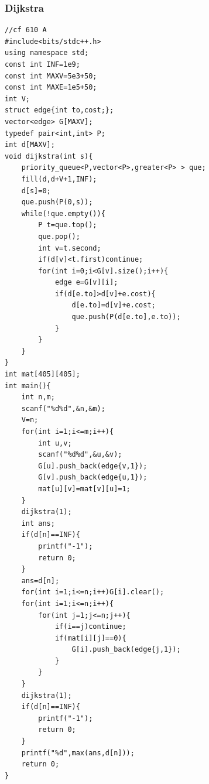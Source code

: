 \documentclass[twoside]{article}
\begin{document}
\subsubsection{Dijkstra}
\begin{lstlisting}
//cf 610 A
#include<bits/stdc++.h>
using namespace std;
const int INF=1e9;
const int MAXV=5e3+50;
const int MAXE=1e5+50;
int V;
struct edge{int to,cost;};
vector<edge> G[MAXV];
typedef pair<int,int> P;
int d[MAXV];
void dijkstra(int s){
    priority_queue<P,vector<P>,greater<P> > que;
    fill(d,d+V+1,INF);
    d[s]=0;
    que.push(P(0,s));
    while(!que.empty()){
        P t=que.top();
        que.pop();
        int v=t.second;
        if(d[v]<t.first)continue;
        for(int i=0;i<G[v].size();i++){
            edge e=G[v][i];
            if(d[e.to]>d[v]+e.cost){
                d[e.to]=d[v]+e.cost;
                que.push(P(d[e.to],e.to));
            }
        }
    }
}
int mat[405][405];
int main(){
    int n,m;
    scanf("%d%d",&n,&m);
    V=n;
    for(int i=1;i<=m;i++){
        int u,v;
        scanf("%d%d",&u,&v);
        G[u].push_back(edge{v,1});
        G[v].push_back(edge{u,1});
        mat[u][v]=mat[v][u]=1;
    }
    dijkstra(1);
    int ans;
    if(d[n]==INF){
        printf("-1");
        return 0;
    }
    ans=d[n];
    for(int i=1;i<=n;i++)G[i].clear();
    for(int i=1;i<=n;i++){
        for(int j=1;j<=n;j++){
            if(i==j)continue;
            if(mat[i][j]==0){
                G[i].push_back(edge{j,1});
            }
        }
    }
    dijkstra(1);
    if(d[n]==INF){
        printf("-1");
        return 0;
    }
    printf("%d",max(ans,d[n]));
    return 0;
}
\end{lstlisting}
\end{document}
